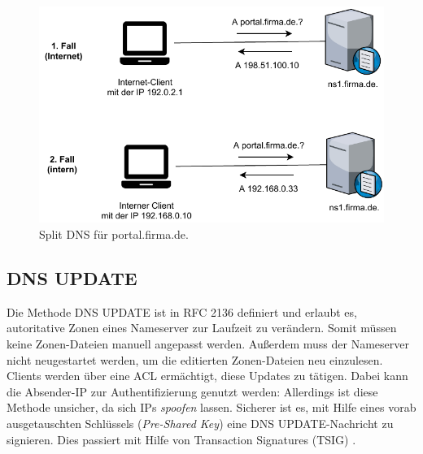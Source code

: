 \begin{figure}[h]
  \centering
  \includegraphics{Figures/dns_split_view.pdf}
  \caption{Split DNS für portal.firma.de.}
  \label{grafik: split-dns}
\end{figure}\FloatBarrier

\subsection{DNS UPDATE}
Die Methode DNS UPDATE ist in RFC 2136 definiert und erlaubt es, autoritative Zonen eines Nameserver zur Laufzeit zu verändern\cite{rfc2136}. Somit müssen keine Zonen-Dateien manuell angepasst werden. Außerdem muss der Nameserver nicht neugestartet werden, um die editierten Zonen-Dateien neu einzulesen.\\
Clients werden über eine ACL ermächtigt, diese Updates zu tätigen. Dabei kann die Absender-IP zur Authentifizierung genutzt werden: Allerdings ist diese Methode unsicher, da sich IPs \textit{spoofen} lassen. Sicherer ist es, mit Hilfe eines vorab ausgetauschten Schlüssels (\textit{Pre-Shared Key}) eine DNS UPDATE-Nachricht zu signieren. Dies passiert mit Hilfe von Transaction Signatures (TSIG) \cite[S.911-914]{Fall2011}.

